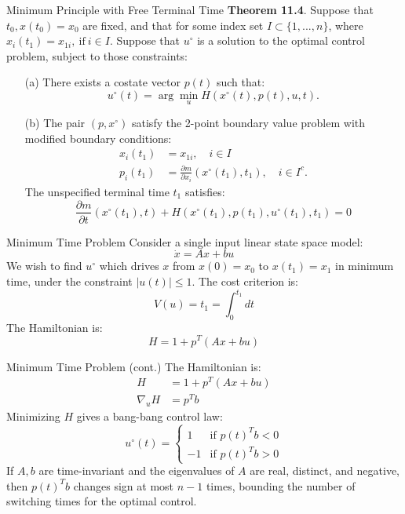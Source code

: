 \documentclass[10pt]{beamer}
\begin{document}
\begin{frame}[fragile]{Minimum Principle with Free Terminal Time}
  \textbf{Theorem 11.4}. Suppose that \( t_0, x(t_0) = x_0 \) are fixed, and that for some index set $I \subset \{1,...,n\}$, where $x_i(t_1)=x_{1i}, \ \text{if} \ i \in I$.
  Suppose that \( u^\circ \) is a solution to the optimal control problem, subject to those constraints:
  \begin{enumerate}
      \item[(a)] There exists a costate vector \( p(t) \) such that:
      \[
        u^\circ(t) = \arg \min_u H(x^\circ(t), p(t), u, t).
      \]
      \item[(b)] The pair \( (p, x^\circ) \) satisfy the 2-point boundary value problem with modified boundary conditions:
      \[
        \begin{aligned}
          x_i(t_1)&=x_{1i}, \quad i \in I \\
          p_i(t_1)&=\frac{\partial m}{\partial x_i} (x^{\circ}(t_1),t_1), \quad i \in I^{c}.
        \end{aligned}
      \]
      The unspecified terminal time \( t_1 \) satisfies:
      \[
      \frac{\partial m}{\partial t}(x^\circ(t_1), t) + H(x^\circ(t_1), p(t_1), u^\circ(t_1), t_1) = 0
      \]
  \end{enumerate}
\end{frame}
  
\begin{frame}[fragile]{Minimum Time Problem}
  Consider a single input linear state space model:
  \[
  \dot{x} = Ax + bu
  \]
  We wish to find \( u^\circ \) which drives \( x \) from \( x(0) = x_0 \) to \( x(t_1) = x_1 \) in minimum time, under the constraint \( |u(t)| \le 1 \). The cost criterion is:
  \[
  V(u) = t_1 = \int_0^{t_1} dt
  \]
  The Hamiltonian is:
  \[
  H = 1 + p^T(Ax + bu)
  \]
\end{frame}
  
\begin{frame}[fragile]{Minimum Time Problem (cont.)}
  The Hamiltonian is:
  \[
    \begin{aligned}
      H &= 1 + p^T(Ax + bu) \\
      \nabla_u H &= p^T b
    \end{aligned}
  \]
  Minimizing \( H \) gives a bang-bang control law:
  \[
  u^\circ(t) = \begin{cases}
  1 & \text{if } p(t)^T b < 0 \\
  -1 & \text{if } p(t)^T b > 0
  \end{cases}
  \]
  If \( A, b \) are time-invariant and the eigenvalues of \( A \) are real, distinct, and negative, then \( p(t)^T b \) changes sign at most \( n - 1 \) times, bounding the number of switching times for the optimal control.
\end{frame}
  
\end{document}
